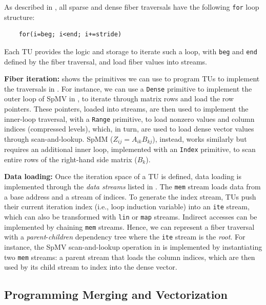 As described in , all sparse and dense fiber traversals have the following \texttt{for} loop structure:

{\small
\begin{verbatim}
    for(i=beg; i<end; i+=stride)
\end{verbatim}
}

Each TU provides the logic and storage to iterate such a loop, with \texttt{beg} and \texttt{end} defined by the fiber traversal, and load fiber values into streams.



\noindent\textbf{Fiber iteration:}
 shows the primitives we can use to program TUs to implement the traversals in .
For instance, we can use a \texttt{Dense} primitive to implement the outer loop of SpMV in , to iterate through matrix rows and load the row pointers.
These pointers, loaded into streams, are then used to implement the inner-loop traversal, with a \texttt{Range} primitive, to load nonzero values and column indices (compressed levels), which, in turn, are used to load dense vector values through scan-and-lookup.
SpMM ($Z_{ij}=A_{ik}B_{kj}$), instead, works similarly but requires an additional inner loop, implemented with an \texttt{Index} primitive, to scan entire rows of the right-hand side matrix ($B_k$).

\noindent\textbf{Data loading:}
Once the iteration space of a TU is defined, data loading is implemented through the \emph{data streams} listed in .
The \texttt{mem} stream loads data from a base address and a stream of indices.
To generate the index stream, TUs push their current iteration index (i.e., loop induction variable) into an \texttt{ite} stream, which can also be transformed with \texttt{lin} or \texttt{map} streams. Indirect accesses can be implemented by chaining \texttt{mem} streams.
Hence, we can represent a fiber traversal with a \textit{parent}-\textit{children} dependency tree where the \texttt{ite} stream is the \textit{root}.
For instance, the SpMV scan-and-lookup operation in  is implemented by instantiating two \texttt{mem} streams: a parent stream that loads the column indices, which are then used by its child stream to index into the dense vector.

\subsection{Programming Merging and Vectorization} \label{sec:tmu-programming-merging-vectorization} %

